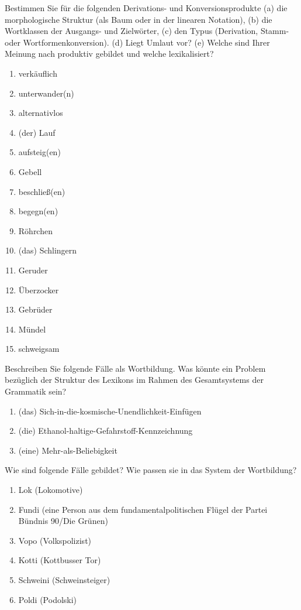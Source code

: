  \label{exc:wortbildung02} Bestimmen Sie für die folgenden Derivations- und Konversionsprodukte (a) die morphologische Struktur (als Baum oder in der linearen Notation), (b) die Wortklassen der Ausgangs- und Zielwörter, (c) den Typus (Derivation, Stamm- oder Wortformenkonversion). (d) Liegt Umlaut vor? (e) Welche sind Ihrer Meinung nach produktiv gebildet und welche lexikalisiert?

\begin{enumerate}
  \item verkäuflich
  \item unterwander(n)
  \item alternativlos
  \item (der) Lauf
  \item aufsteig(en)
  \item Gebell
  \item beschließ(en)
  \item begegn(en)
  \item Röhrchen
  \item (das) Schlingern
  \item Geruder
  \item Überzocker
  \item Gebrüder
  \item Mündel
  \item schweigsam
\end{enumerate}

 \label{exc:wortbildung03} Beschreiben Sie folgende Fälle als Wortbildung.
Was könnte ein Problem bezüglich der Struktur des Lexikons im Rahmen des Gesamtsystems der Grammatik sein?

\begin{enumerate}
  \item (das) Sich-in-die-kosmische-Unendlichkeit-Einfügen
  \item (die) Ethanol-haltige-Gefahrstoff-Kennzeichnung
  \item (eine) Mehr-als-Beliebigkeit
\end{enumerate}

 \label{exc:wortbildung04} Wie sind folgende Fälle gebildet?
Wie passen sie in das System der Wortbildung?

\begin{enumerate}
  \item Lok (Lokomotive)
  \item Fundi (eine Person aus dem fundamentalpolitischen Flügel der Partei Bündnis 90\slash Die Grünen)
  \item Vopo (Volkspolizist)
  \item Kotti (Kottbusser Tor)
  \item Schweini (Schweinsteiger)
  \item Poldi (Podolski)
\end{enumerate}

